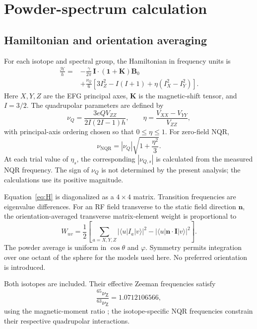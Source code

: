 \documentclass[10pt,a4paper,twocolumn]{article}
\newcommand{\nqr}{\mathrm{NQR}}
\newcommand{\nuz}{\nu_{\mathrm Z}}
\newcommand{\nuq}{\nu_Q}
\begin{document}
\section{Powder-spectrum calculation}

\subsection{Hamiltonian and orientation averaging}

For each isotope and spectral group, the Hamiltonian in frequency units is
\begin{align}
\frac{\mathcal H}{h}
={}&-\frac{\gamma}{2\pi}\,
\bm I\cdot(\bm 1+\bm K)\bm B_0 \nonumber\\
&+\frac{\nuq}{6}
\left[3I_Z^2-I(I+1)+\eta(I_X^2-I_Y^2)\right].
\label{eq:H}
\end{align}
Here $X,Y,Z$ are the EFG principal axes, $\bm K$ is the magnetic-shift tensor, and $I=3/2$. The quadrupolar parameters are defined by
\begin{equation}
\nuq=\frac{3eQV_{ZZ}}{2I(2I-1)h},
\qquad
\eta=\frac{V_{XX}-V_{YY}}{V_{ZZ}},
\label{eq:def}
\end{equation}
with principal-axis ordering chosen so that $0\leq\eta\leq1$. For zero-field NQR,
\begin{equation}
\nu_{\nqr}=|\nuq|\sqrt{1+\frac{\eta^2}{3}}.
\label{eq:nqr}
\end{equation}
At each trial value of $\eta_s$, the corresponding $|\nu_{Q,s}|$ is calculated from the measured NQR frequency. The sign of $\nuq$ is not determined by the present analysis; the calculations use its positive magnitude.

Equation~\eqref{eq:H} is diagonalized as a $4\times4$ matrix. Transition frequencies are eigenvalue differences. For an RF field transverse to the static field direction $\bm n$, the orientation-averaged transverse matrix-element weight is proportional to
\begin{equation}
W_{uv}=\frac12\left[
\sum_{a=X,Y,Z}|\langle u|I_a|v\rangle|^2
-|\langle u|\bm n\cdot\bm I|v\rangle|^2
\right].
\label{eq:weight}
\end{equation}
The powder average is uniform in $\cos\theta$ and $\varphi$. Symmetry permits integration over one octant of the sphere for the models used here. No preferred orientation is introduced.

Both isotopes are included. Their effective Zeeman frequencies satisfy
\begin{equation}
\frac{^{65}\nuz}{^{63}\nuz}=1.0712106566,
\end{equation}
using the magnetic-moment ratio \citep{Locher1974}; the isotope-specific NQR frequencies constrain their respective quadrupolar interactions.
\end{document}
